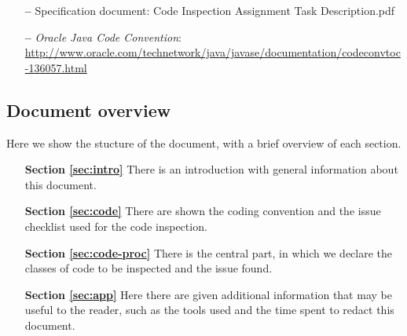 \begin{itemize}
\item[\textbf{--}] Specification document: Code Inspection Assignment Task Description.pdf
\item[\textbf{--}] \textit{Oracle Java Code Convention}: \url{http://www.oracle.com/technetwork/java/javase/documentation/codeconvtoc-136057.html}
\end{itemize}

\subsection{Document overview}

Here we show the stucture of the document, with a brief overview of each section.

\begin{itemize}

\item[\textbf{Section \ref{sec:intro}}]There is an introduction with general information about this document.

\item[\textbf{Section \ref{sec:code}}]There are shown the coding convention and the issue checklist used for the code inspection.

\item[\textbf{Section \ref{sec:code-proc}}]There is the central part, in which we declare the classes of code to be inspected and the issue found.

\item[\textbf{Section \ref{sec:app}}]Here there are given additional information that may be useful to the reader, such as the tools used and the time spent to redact this document.
\end{itemize}